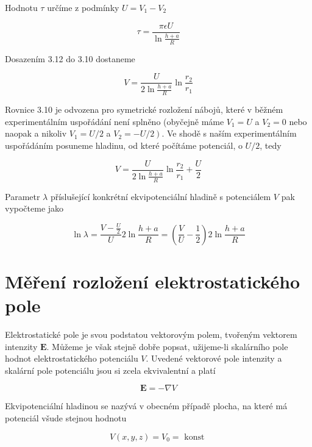 \documentclass[10pt]{article}
\begin{document}
Hodnotu $\tau$ určíme z podmínky $U=V_{1}-V_{2}$


\begin{equation*}
\tau=\frac{\pi \epsilon U}{\ln \frac{h+a}{R}} \tag{3.12}
\end{equation*}


Dosazením 3.12 do 3.10 dostaneme


\begin{equation*}
V=\frac{U}{2 \ln \frac{h+a}{R}} \ln \frac{r_{2}}{r_{1}} \tag{3.13}
\end{equation*}


Rovnice 3.10 je odvozena pro symetrické rozložení nábojů, které v běžném experimentálním uspořádání není splněno (obyčejně máme $V_{1}=U$ a $V_{2}=0$ nebo naopak a nikoliv $V_{1}=U / 2$ a $\left.V_{2}=-U / 2\right)$. Ve shodě s naším experimentálním uspořádáním posuneme hladinu, od které počítáme potenciál, o $U / 2$, tedy


\begin{equation*}
V=\frac{U}{2 \ln \frac{h+a}{R}} \ln \frac{r_{2}}{r_{1}}+\frac{U}{2} \tag{3.14}
\end{equation*}


Parametr $\lambda$ příslušející konkrétní ekvipotenciální hladině s potenciálem $V$ pak vypočteme jako


\begin{equation*}
\ln \lambda=\frac{V-\frac{U}{2}}{U} 2 \ln \frac{h+a}{R}=\left(\frac{V}{U}-\frac{1}{2}\right) 2 \ln \frac{h+a}{R} \tag{3.15}
\end{equation*}


\section*{Měření rozložení elektrostatického pole}
Elektrostatické pole je svou podstatou vektorovým polem, tvořeným vektorem intenzity $\boldsymbol{E}$. Můžeme je však stejně dobře popsat, užijeme-li skalárního pole hodnot elektrostatického potenciálu $V$. Uvedené vektorové pole intenzity a skalární pole potenciálu jsou si zcela ekvivalentní a platí


\begin{equation*}
\boldsymbol{E}=-\nabla V \tag{3.16}
\end{equation*}


Ekvipotenciální hladinou se nazývá v obecném případě plocha, na které má potenciál všude stejnou hodnotu


\begin{equation*}
V(x, y, z)=V_{0}=\text { konst } \tag{3.17}
\end{equation*}
\end{document}
